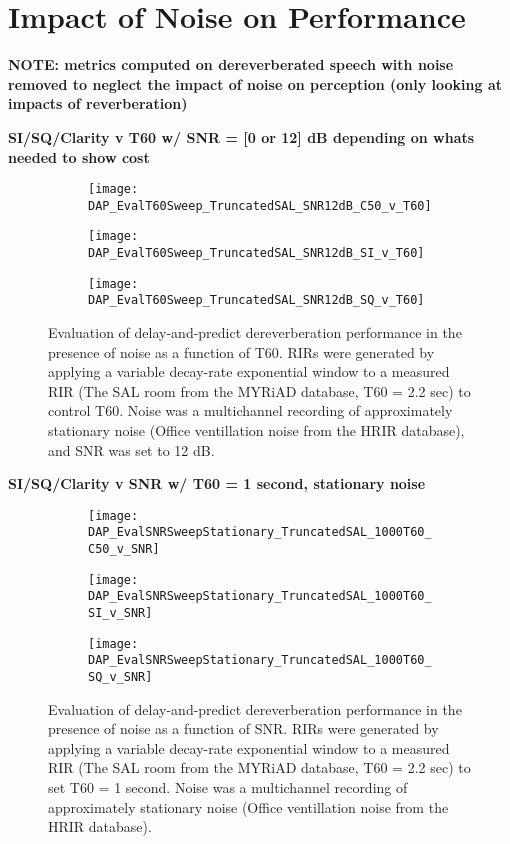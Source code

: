 \section{Impact of Noise on Performance}

\textbf{NOTE: metrics computed on dereverberated speech with noise removed to  neglect the impact of noise on perception (only looking at impacts of reverberation)}

\textbf{SI/SQ/Clarity v T60 w/ SNR = [0 or 12] dB depending on whats needed to show cost}


\begin{figure}[H]
	\centering
	\begin{subfigure}[b]{0.47\textwidth}
		\centering
		\texttt{[image: DAP\_EvalT60Sweep\_TruncatedSAL\_SNR12dB\_C50\_v\_T60]}
	\end{subfigure}
	\begin{subfigure}[b]{0.92\textwidth}
		\centering
		\texttt{[image: DAP\_EvalT60Sweep\_TruncatedSAL\_SNR12dB\_SI\_v\_T60]}
	\end{subfigure}
	\begin{subfigure}[b]{0.92\textwidth}
		\centering
		\texttt{[image: DAP\_EvalT60Sweep\_TruncatedSAL\_SNR12dB\_SQ\_v\_T60]}
	\end{subfigure}
	\caption{Evaluation of delay-and-predict dereverberation performance in the presence of noise as a function of T60. RIRs were generated by applying a variable decay-rate exponential window to a measured RIR (The SAL room from the MYRiAD database, T60 = 2.2 sec) to control T60. Noise was a multichannel recording of approximately stationary noise (Office ventillation noise from the HRIR database), and SNR was set to 12 dB.}
	\label{fig:DAP_EvalT60Sweep_TruncatedSAL_SNR12dB}
\end{figure}

\textbf{SI/SQ/Clarity v SNR w/ T60 = 1 second, stationary noise}

\begin{figure}[H]
	\centering
	\begin{subfigure}[b]{0.47\textwidth}
		\centering
		\texttt{[image: DAP\_EvalSNRSweepStationary\_TruncatedSAL\_1000T60\_C50\_v\_SNR]}
	\end{subfigure}
	\begin{subfigure}[b]{0.92\textwidth}
		\centering
		\texttt{[image: DAP\_EvalSNRSweepStationary\_TruncatedSAL\_1000T60\_SI\_v\_SNR]}
	\end{subfigure}
	\begin{subfigure}[b]{0.92\textwidth}
		\centering
		\texttt{[image: DAP\_EvalSNRSweepStationary\_TruncatedSAL\_1000T60\_SQ\_v\_SNR]}
	\end{subfigure}
	\caption{Evaluation of delay-and-predict dereverberation performance in the presence of noise as a function of SNR. RIRs were generated by applying a variable decay-rate exponential window to a measured RIR (The SAL room from the MYRiAD database, T60 = 2.2 sec) to set T60 = 1 second. Noise was a multichannel recording of approximately stationary noise (Office ventillation noise from the HRIR database).}
	\label{fig:DAP_EvalSNRSweepStationary_TruncatedSAL_1000T60}
\end{figure}

